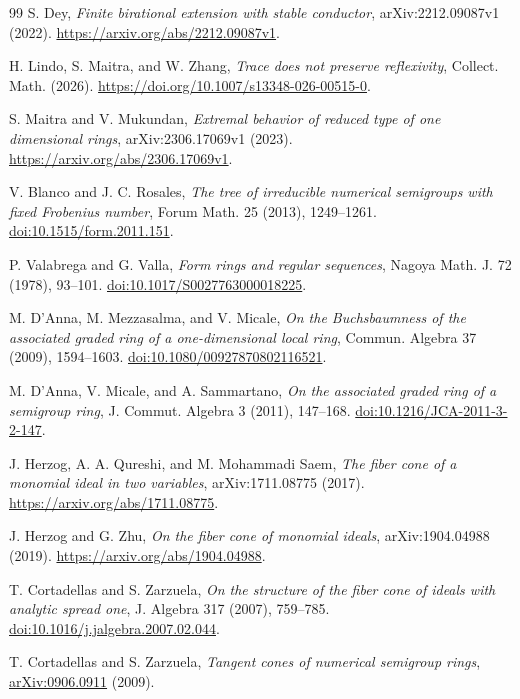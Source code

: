 \documentclass[11pt]{article}
\theoremstyle{definition}
\theoremstyle{remark}
\begin{document}
{\begin{thebibliography}{99}
S. Dey,
\emph{Finite birational extension with stable conductor},
arXiv:2212.09087v1 (2022).
\url{https://arxiv.org/abs/2212.09087v1}.

H. Lindo, S. Maitra, and W. Zhang,
\emph{Trace does not preserve reflexivity},
Collect. Math. (2026).
\url{https://doi.org/10.1007/s13348-026-00515-0}.

S. Maitra and V. Mukundan,
\emph{Extremal behavior of reduced type of one dimensional rings},
arXiv:2306.17069v1 (2023).
\url{https://arxiv.org/abs/2306.17069v1}.

V. Blanco and J. C. Rosales,
\emph{The tree of irreducible numerical semigroups with fixed Frobenius number},
Forum Math. 25 (2013), 1249--1261.
\href{https://doi.org/10.1515/form.2011.151}{doi:10.1515/form.2011.151}.

P. Valabrega and G. Valla,
\emph{Form rings and regular sequences},
Nagoya Math. J. 72 (1978), 93--101.
\href{https://doi.org/10.1017/S0027763000018225}{doi:10.1017/S0027763000018225}.

M. D'Anna, M. Mezzasalma, and V. Micale,
\emph{On the Buchsbaumness of the associated graded ring of a one-dimensional local ring},
Commun. Algebra 37 (2009), 1594--1603.
\href{https://doi.org/10.1080/00927870802116521}{doi:10.1080/00927870802116521}.

M. D'Anna, V. Micale, and A. Sammartano,
\emph{On the associated graded ring of a semigroup ring},
J. Commut. Algebra 3 (2011), 147--168.
\href{https://doi.org/10.1216/JCA-2011-3-2-147}{doi:10.1216/JCA-2011-3-2-147}.

J. Herzog, A. A. Qureshi, and M. Mohammadi Saem,
\emph{The fiber cone of a monomial ideal in two variables}, arXiv:1711.08775 (2017).
\url{https://arxiv.org/abs/1711.08775}.

J. Herzog and G. Zhu,
\emph{On the fiber cone of monomial ideals}, arXiv:1904.04988 (2019).
\url{https://arxiv.org/abs/1904.04988}.

T. Cortadellas and S. Zarzuela,
\emph{On the structure of the fiber cone of ideals with analytic spread one},
J. Algebra 317 (2007), 759--785.
\href{https://doi.org/10.1016/j.jalgebra.2007.02.044}{doi:10.1016/j.jalgebra.2007.02.044}.

T. Cortadellas and S. Zarzuela,
\emph{Tangent cones of numerical semigroup rings},
\href{https://arxiv.org/abs/0906.0911}{arXiv:0906.0911} (2009).


\end{thebibliography}}
\end{document}
